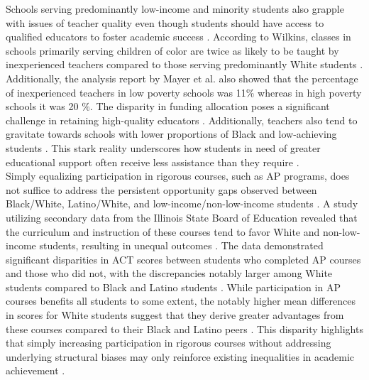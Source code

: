\documentclass[sn-mathphys-num]{sn-jnl}%
\theoremstyle{thmstyleone}%
\theoremstyle{thmstyletwo}%
\theoremstyle{thmstylethree}%
\begin{document}
Schools serving predominantly low-income and minority students also grapple with issues of teacher quality even though students should have access to qualified educators to foster academic success \cite{wilkins2006yes, monitoring_school_quality, carter2013closing, orfield2006vicious}. According to Wilkins, classes in schools primarily serving children of color are twice as likely to be taught by inexperienced teachers compared to those serving predominantly White students \cite{wilkins2006yes}. Additionally, the analysis report by Mayer et al. \cite{monitoring_school_quality} also showed that the percentage of inexperienced teachers in low poverty schools was 11$\%$ whereas in high poverty schools it was 20 $\%$. The disparity in funding allocation poses a significant challenge in retaining high-quality educators \cite{wilkins2006yes, wiener2007opportunity}. Additionally, teachers also tend to gravitate towards schools with lower proportions of Black and low-achieving students \cite{whither_opportunity}. This stark reality underscores how students in need of greater educational support often receive less assistance than they require \cite{carter2013closing}.\\

Simply equalizing participation in rigorous courses, such as AP programs, does not suffice to address the persistent opportunity gaps observed between Black/White, Latino/White, and low-income/non-low-income students \cite{colgren2015closing, flores2007examining}. A study utilizing secondary data from the Illinois State Board of Education revealed that the curriculum and instruction of these courses tend to favor White and non-low-income students, resulting in unequal outcomes \cite{colgren2015closing}. The data demonstrated significant disparities in ACT scores between students who completed AP courses and those who did not, with the discrepancies notably larger among White students compared to Black and Latino students \cite{colgren2015closing}. While participation in AP courses benefits all students to some extent, the notably higher mean differences in scores for White students suggest that they derive greater advantages from these courses compared to their Black and Latino peers \cite{colgren2015closing}. This disparity highlights that simply increasing participation in rigorous courses without addressing underlying structural biases may only reinforce existing inequalities in academic achievement \cite{flores2007examining, colgren2015closing}.\\
\end{document}
